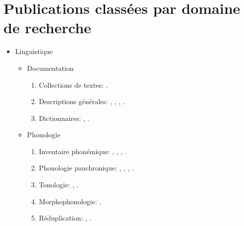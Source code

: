 \documentclass[oneside,a4paper,11pt]{article}
\newcommand{\zh}[1]{{\cn #1}}
\newcommand{\lingua}[3]{#2}%
\begin{document}
\section{\lingua{By topics}{Publications classées par domaine de recherche}{研究领域}}
\begin{itemize}
\item  \lingua{Linguistics}{Linguistique}{语言学}
\begin{itemize}
\item  \lingua{Documentation}{Documentation}{记录语言学}
\begin{enumerate}
\item  \lingua{Text collections}{Collections de textes}{语料库}: \cite{jacques10gesar}.
\item \lingua{General descriptions}{Descriptions générales}{语法概论以及语法参考书}: \cite{jacques04these}, \cite{jacques08}, \cite{jacques17sketch}, \cite{jacques17stau}.
\item \lingua{Dictionaries}{Dictionnaires}{词典}: \cite{jacques15japhug}, \cite{jacques15khaling}.
\end{enumerate}

\item \lingua{Phonology}{Phonologie}{音系学}
\begin{enumerate}
\item  \lingua{Phonemic inventory}{Inventaire phonémique}{音位系统}: \cite{jacques04these},  \cite{jacques12khaling}, \cite{jacques14cone}, \cite{jacques18ipa}.
\item  \lingua{Panchronic Phonology}{Phonologie panchronique}{泛时音系学}:  \cite{jacques11lingua}, \cite{michaud-jacques12nasalite},     \cite{jacques13arapaho}, \cite{jacques16phono.arapaho}.
\item   \lingua{Tonology}{Tonologie}{声调}: \cite{jacques11pumi.tone}, \cite{jacques16tonogenesis}.
\item \lingua{Morphophonology}{Morphophonologie}{形态音系学}: \cite{jacques12khaling}.
\item \lingua{Reduplication}{Réduplication}{重叠式}:  \cite{jacques04redupl},  \cite{jacques07redupl}.
\end{enumerate}


\end{itemize}
\end{itemize}
\end{document}
